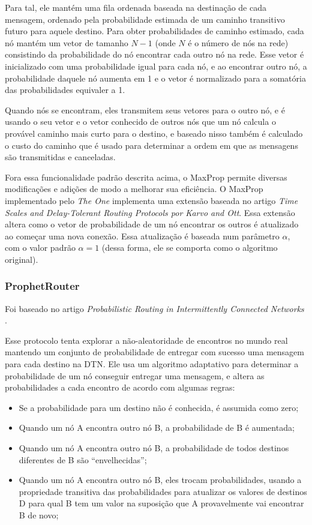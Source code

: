 \documentclass[conference]{IEEEtran}
\begin{document}
Para tal, ele mantém uma fila ordenada baseada na destinação de cada mensagem, ordenado pela probabilidade
estimada de um caminho transitivo futuro para aquele destino. Para obter probabilidades de caminho estimado,
cada nó mantém um vetor de tamanho $N-1$ (onde $N$ é o número de nós na rede) consistindo da probabilidade
do nó encontrar cada outro nó na rede. Esse vetor é inicializado com uma probabilidade igual para cada nó,
e ao encontrar outro nó, a probabilidade daquele nó aumenta em 1 e o vetor é normalizado para a somatória
das probabilidades equivaler a 1.

Quando nós se encontram, eles transmitem seus vetores para o outro nó, e é usando o seu vetor e o vetor
conhecido de outros nós que um nó calcula o provável caminho mais curto para o destino, e baseado nisso
também é calculado o custo do caminho que é usado para determinar a ordem em que as mensagens são transmitidas
e canceladas.

Fora essa funcionalidade padrão descrita acima, o MaxProp permite diversas modificações e adições de modo 
a melhorar sua eficiência. O MaxProp implementado pelo \emph{The One} implementa uma extensão baseada no artigo
\textit{Time Scales and Delay-Tolerant Routing Protocols por Karvo and Ott}. Essa extensão altera como
o vetor de probabilidade de um nó encontrar os outros é atualizado ao começar uma nova conexão. Essa atualização
é baseada num parâmetro $\alpha$, com o valor padrão $\alpha=1$ (dessa forma, ele se comporta como o algoritmo 
original).
 
\subsubsection{ProphetRouter}
Foi baseado no artigo \textit{Probabilistic Routing in Intermittently Connected Networks} \cite{ProphetRouter:original}.
 
Esse protocolo tenta explorar a não-aleatoridade de encontros no mundo real mantendo um conjunto de probabilidade de entregar com sucesso uma mensagem para cada destino na DTN. Ele usa um algoritmo adaptativo para determinar a probabilidade de um nó conseguir entregar uma mensagem, e altera as probabilidades a cada encontro de acordo com algumas regras:
\begin{itemize}
  \item Se a probabilidade para um destino não é conhecida, é assumida como zero;
  \item Quando um nó A encontra outro nó B, a probabilidade de B é aumentada;
  \item Quando um nó A encontra outro nó B, a probabilidade de todos destinos diferentes de B são \textquotedblleft envelhecidas\textquotedblright ;
  \item Quando um nó A encontra outro nó B, eles trocam probabilidades, usando a propriedade transitiva das probabilidades para atualizar os valores de destinos D para qual B tem um valor na suposição que A provavelmente vai encontrar B de novo;
\end{itemize}
\end{document}

